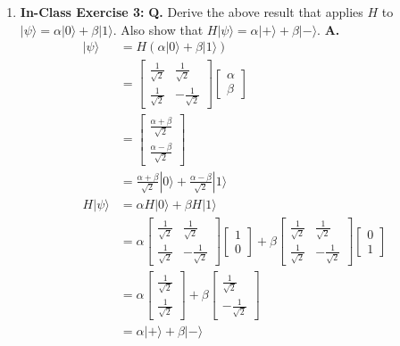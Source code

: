 \documentclass[main.tex]{subfiles}
\begin{document}
\begin{enumerate}
\item[] \textbf{In-Class Exercise 3:} \textbf{Q.} Derive the above result that applies $H$ to $|\psi\rangle=\alpha|0\rangle+\beta|1\rangle$. Also show that $H|\psi\rangle=\alpha|+\rangle+\beta|-\rangle$. \textbf{A.}
\begin{align*}
    | \psi \rangle      & = H \left( \alpha | 0 \rangle + \beta | 1 \rangle \right) \\
                        & = \left[\begin{array}{ll} \frac{1}{\sqrt{2}} & \frac{1}{\sqrt{2}} \\ \frac{1}{\sqrt{2}} & -\frac{1}{\sqrt{2}} \end{array} \right] 
                        \left[\begin{array}{l} \alpha \\ \beta \end{array} \right]\\
                        & =  \left[\begin{array}{l} \frac{\alpha + \beta}{\sqrt{2}} \\ \frac{\alpha - \beta}{\sqrt{2}} \end{array} \right] \\
                        & = \frac{\alpha+\beta}{\sqrt{2}}|0\rangle+\frac{\alpha-\beta}{\sqrt{2}}|1\rangle \\
    H | \psi \rangle    & = \alpha H | 0 \rangle + \beta H | 1 \rangle \\
                        & =  \alpha \left[\begin{array}{ll} \frac{1}{\sqrt{2}} & \frac{1}{\sqrt{2}} \\ \frac{1}{\sqrt{2}} & -\frac{1}{\sqrt{2}} \end{array}\right] \left[\begin{array}{l} 1 \\ 0 \end{array} \right]
                        + \beta \left[\begin{array}{ll} \frac{1}{\sqrt{2}} & \frac{1}{\sqrt{2}} \\ \frac{1}{\sqrt{2}} & -\frac{1}{\sqrt{2}} \end{array}\right] \left[\begin{array}{l} 0 \\ 1 \end{array} \right]\\
                        & =  \alpha \left[\begin{array}{l} \frac{1}{\sqrt{2}} \\ \frac{1}{\sqrt{2}} \end{array} \right]
                        + \beta \left[\begin{array}{l} \frac{1}{\sqrt{2}} \\ -\frac{1}{\sqrt{2}} \end{array} \right]\\
                        & = \alpha | + \rangle + \beta | - \rangle
\end{align*}


\end{enumerate}
\end{document}
